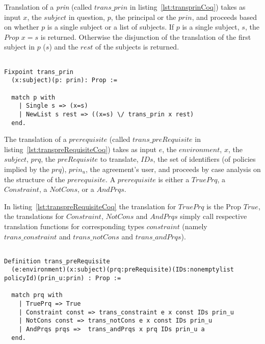 Translation of a \emph{prin} (called $trans\_prin$ in listing~\ref{lst:transprinCoq}) takes as input $x$, the $subject$ in question, $p$, the principal or the $prin$,  and proceeds based on whether $p$ is a single subject or a list of subjects. If $p$ is a single subject, $s$, the $Prop$ $x=s$ is returned. Otherwise the disjunction of the translation of the first subject in $p$ ($s$) and the $rest$ of the subjects is returned.

\begin{lstlisting}

Fixpoint trans_prin
  (x:subject)(p: prin): Prop :=

  match p with
    | Single s => (x=s)
    | NewList s rest => ((x=s) \/ trans_prin x rest)
  end.
\end{lstlisting}



The translation of a $prerequisite$ (called $trans\_preRequisite$ in listing~\ref{lst:transpreRequisiteCoq}) takes as input $e$, the $environment$, $x$, the $subject$, $prq$, the $preRequisite$ to translate, $IDs$, the set of identifiers (of policies implied by the $prq$), $prin_{u}$, the agreement's user, and proceeds by case analysis on the structure of the $prerequisite$. A $prerequisite$ is either a $TruePrq$, a $Constraint$, a $NotCons$, or a $AndPrqs$. 

In listing~\ref{lst:transpreRequisiteCoq} the translation for $TruePrq$ is the Prop $True$, the translations for $Constraint$, $NotCons$ and $AndPrqs$ simply call respective translation functions for corresponding types $constraint$ (namely $trans\_constraint$ and $trans\_notCons$ and $trans\_andPrqs$). 


\begin{minipage}[c]{0.95\textwidth}
\begin{lstlisting}

Definition trans_preRequisite
  (e:environment)(x:subject)(prq:preRequisite)(IDs:nonemptylist policyId)(prin_u:prin) : Prop := 

  match prq with
    | TruePrq => True
    | Constraint const => trans_constraint e x const IDs prin_u  
    | NotCons const => trans_notCons e x const IDs prin_u 
    | AndPrqs prqs =>  trans_andPrqs x prq IDs prin_u a
  end.
\end{lstlisting}
\end{minipage}

